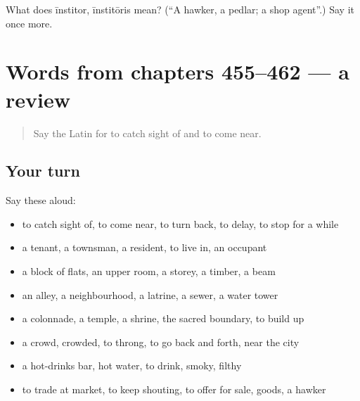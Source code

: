 \begin{tcolorbox}[breakable,colback=teal!4,colframe=teal!35!black,title={Before you move on}]
What does īnstitor, īnstitōris mean? (\textquotedblleft{}A hawker, a pedlar; a shop agent\textquotedblright{}.) Say it once more.
\end{tcolorbox}
\section[(dialogue)]{Words from chapters 455–462 — a review}

\label{lesson:LA-R462-review-455-462}



\begin{quote}
Say the Latin for to catch sight of and to come near.
\end{quote}

\subsection*{Your turn}
Say these aloud:

\begin{itemize}
\raggedright
  \item to catch sight of, to come near, to turn back, to delay, to stop for a while
  \item a tenant, a townsman, a resident, to live in, an occupant
  \item a block of flats, an upper room, a storey, a timber, a beam
  \item an alley, a neighbourhood, a latrine, a sewer, a water tower
  \item a colonnade, a temple, a shrine, the sacred boundary, to build up
  \item a crowd, crowded, to throng, to go back and forth, near the city
  \item a hot-drinks bar, hot water, to drink, smoky, filthy
  \item to trade at market, to keep shouting, to offer for sale, goods, a hawker
\end{itemize}

